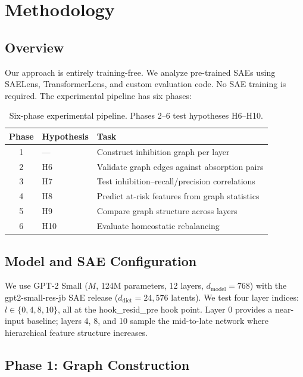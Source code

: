 \documentclass{article}
\begin{document}
\section{Methodology}
\label{sec:methodology}

\subsection{Overview}

Our approach is entirely training-free. We analyze pre-trained SAEs using SAELens, TransformerLens, and custom evaluation code. No SAE training is required. The experimental pipeline has six phases:

\begin{table}[h]
\caption{Six-phase experimental pipeline. Phases 2--6 test hypotheses H6--H10.}
\label{tab:pipeline}
\centering
\small
\begin{tabular}{@{}cll@{}}
\toprule
Phase & Hypothesis & Task \\
\midrule
1 & --- & Construct inhibition graph per layer \\
2 & H6 & Validate graph edges against absorption pairs \\
3 & H7 & Test inhibition--recall/precision correlations \\
4 & H8 & Predict at-risk features from graph statistics \\
5 & H9 & Compare graph structure across layers \\
6 & H10 & Evaluate homeostatic rebalancing \\
\bottomrule
\end{tabular}
\end{table}

\subsection{Model and SAE Configuration}

We use GPT-2 Small ($M$, 124M parameters, 12 layers, $d_{\text{model}} = 768$) with the gpt2-small-res-jb SAE release ($d_{\text{dict}} = 24{,}576$ latents). We test four layer indices: $l \in \{0, 4, 8, 10\}$, all at the hook\_resid\_pre hook point. Layer 0 provides a near-input baseline; layers 4, 8, and 10 sample the mid-to-late network where hierarchical feature structure increases.

\subsection{Phase 1: Graph Construction}
\end{document}
